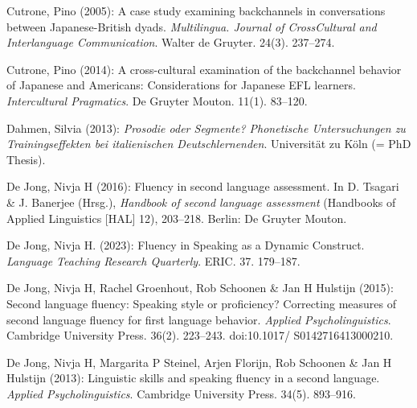 \begin{styleBibliography}
Cutrone, Pino (2005): A case study examining backchannels in conversations between Japanese-British dyads. \textit{Multilingua. Journal of CrossCultural and Interlanguage Communication}. Walter de Gruyter. 24(3). 237–274.
\end{styleBibliography}

\begin{styleBibliography}
Cutrone, Pino (2014): A cross-cultural examination of the backchannel behavior of Japanese and Americans: Considerations for Japanese EFL learners. \textit{Intercultural Pragmatics}. De Gruyter Mouton. 11(1). 83–120.
\end{styleBibliography}

\begin{styleBibliography}
Dahmen, Silvia (2013): \textit{Prosodie oder Segmente? Phonetische Untersuchungen zu Trainingseffekten bei italienischen Deutschlernenden}. Universität zu Köln (= PhD Thesis).
\end{styleBibliography}

\begin{styleBibliography}
De Jong, Nivja H (2016): Fluency in second language assessment. In D. Tsagari \& J. Banerjee (Hrsg.), \textit{Handbook of second language assessment} (Handbooks of Applied Linguistics [HAL] 12), 203–218. Berlin: De Gruyter Mouton.
\end{styleBibliography}

\begin{styleBibliography}
De Jong, Nivja H. (2023): Fluency in Speaking as a Dynamic Construct. \textit{Language Teaching Research Quarterly}. ERIC. 37. 179–187.
\end{styleBibliography}

\begin{styleBibliography}
De Jong, Nivja H, Rachel Groenhout, Rob Schoonen \& Jan H Hulstijn (2015): Second language fluency: Speaking style or proficiency? Correcting measures of second language fluency for first language behavior. \textit{Applied Psycholinguistics}. Cambridge University Press. 36(2). 223–243. doi:10.1017/ S0142716413000210.
\end{styleBibliography}

\begin{styleBibliography}
De Jong, Nivja H, Margarita P Steinel, Arjen Florijn, Rob Schoonen \& Jan H Hulstijn (2013): Linguistic skills and speaking fluency in a second language. \textit{Applied Psycholinguistics}. Cambridge University Press. 34(5). 893–916.
\end{styleBibliography}

